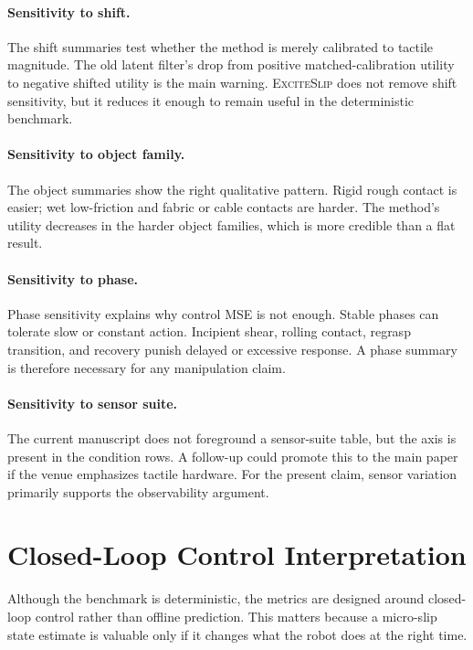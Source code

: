 \documentclass{article}
\newcommand{\method}{\textsc{ExciteSlip}\xspace}
\begin{document}
\paragraph{Sensitivity to shift.}
The shift summaries test whether the method is merely calibrated to tactile magnitude. The old latent filter's drop from positive matched-calibration utility to negative shifted utility is the main warning. \method does not remove shift sensitivity, but it reduces it enough to remain useful in the deterministic benchmark.

\paragraph{Sensitivity to object family.}
The object summaries show the right qualitative pattern. Rigid rough contact is easier; wet low-friction and fabric or cable contacts are harder. The method's utility decreases in the harder object families, which is more credible than a flat result.

\paragraph{Sensitivity to phase.}
Phase sensitivity explains why control MSE is not enough. Stable phases can tolerate slow or constant action. Incipient shear, rolling contact, regrasp transition, and recovery punish delayed or excessive response. A phase summary is therefore necessary for any manipulation claim.

\paragraph{Sensitivity to sensor suite.}
The current manuscript does not foreground a sensor-suite table, but the axis is present in the condition rows. A follow-up could promote this to the main paper if the venue emphasizes tactile hardware. For the present claim, sensor variation primarily supports the observability argument.

\section{Closed-Loop Control Interpretation}

Although the benchmark is deterministic, the metrics are designed around closed-loop control rather than offline prediction. This matters because a micro-slip state estimate is valuable only if it changes what the robot does at the right time.
\end{document}
